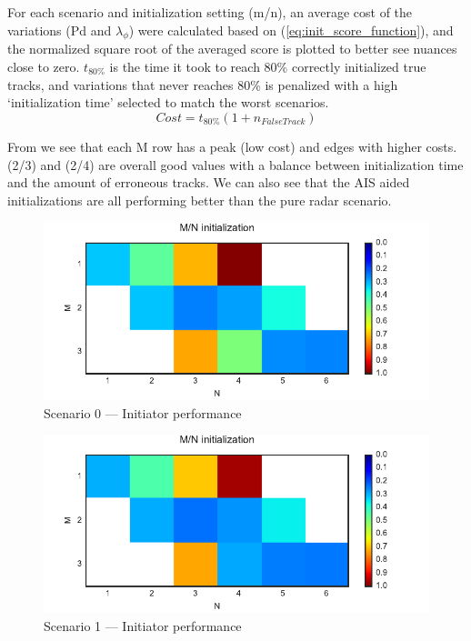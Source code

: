 For each scenario and initialization setting (m/n), an average cost of the variations (\gls{Pd} and \(\lambda_\phi\)) were calculated based on (\ref{eq:init_score_function}), and the normalized square root of the averaged score is plotted to better see nuances close to zero. \(t_{80\%}\) is the time it took to reach 80\% correctly initialized true tracks, and variations that never reaches 80\% is penalized with a high `initialization time' selected to match the worst scenarios.
\begin{equation}\label{eq:init_score_function}
Cost = t_{80\%} (1 + n_{False Track})
\end{equation}

From  we see that each M row has a peak (low cost) and edges with higher costs. (2/3) and (2/4) are overall good values with a balance between initialization time and the amount of erroneous tracks. We can also see that the AIS aided initializations are all performing better than the pure radar scenario. 
\begin{figure}[H]
 \centering
 \includegraphics{Figures/plots/Scenario0_Init-Performance.pdf}
 \caption{Scenario 0 --- Initiator performance}\label{fig:init_performance_scenario0}
\end{figure}
\begin{figure}
 \centering
 \includegraphics{Figures/plots/Scenario1_Init-Performance.pdf}
 \caption{Scenario 1 --- Initiator performance}\label{fig:init_performance_scenario1}
\end{figure}

